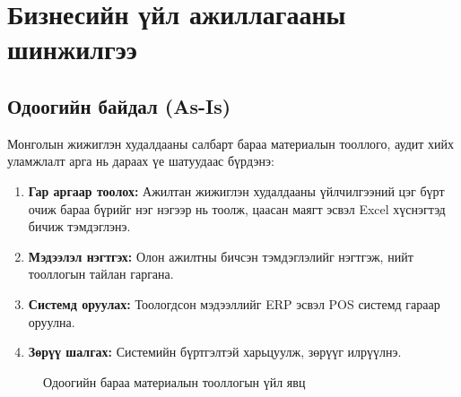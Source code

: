 \section{Бизнесийн үйл ажиллагааны шинжилгээ}

\subsection{Одоогийн байдал (As-Is)}

Монголын жижиглэн худалдааны салбарт бараа материалын тооллого, аудит хийх уламжлалт арга нь дараах үе шатуудаас бүрдэнэ:

\begin{enumerate}
    \item \textbf{Гар аргаар тоолох:} Ажилтан жижиглэн худалдааны үйлчилгээний цэг бүрт очиж бараа бүрийг нэг нэгээр нь тоолж, цаасан маягт эсвэл Excel хүснэгтэд бичиж тэмдэглэнэ.
    \item \textbf{Мэдээлэл нэгтгэх:} Олон ажилтны бичсэн тэмдэглэлийг нэгтгэж, нийт тооллогын тайлан гаргана.
    \item \textbf{Системд оруулах:} Тоологдсон мэдээллийг ERP эсвэл POS системд гараар оруулна.
    \item \textbf{Зөрүү шалгах:} Системийн бүртгэлтэй харьцуулж, зөрүүг илрүүлнэ.
\end{enumerate}

\begin{figure}[H]
\centering
{}
\caption{Одоогийн бараа материалын тооллогын үйл явц}
\label{fig:current_process_asis}
\end{figure}

